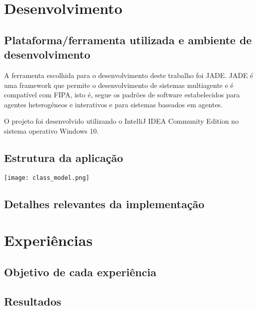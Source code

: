 \documentclass[a4paper]{article}
\begin{document}
\newpage

\section{Desenvolvimento}

\subsection{Plataforma/ferramenta utilizada e ambiente de desenvolvimento} 

A ferramenta escolhida para o desenvolvimento deste trabalho foi JADE. JADE é uma framework que permite o desenvolvimento de sistemas multiagente e é compatível com FIPA, isto é, segue os padrões de software estabelecidos para agentes heterogéneos e interativos e para sistemas baseados em agentes.

O projeto foi desenvolvido utilizando o IntelliJ IDEA Community Edition no sistema operativo Windows 10.

\subsection{Estrutura da aplicação} 

\begin{center}
\hspace*{-3.2cm}
	\texttt{[image: class\_model.png]}\linebreak\linebreak
\end{center}

\subsection{Detalhes relevantes da implementação} 

\newpage

\section{Experiências}

\subsection{Objetivo de cada experiência} 

\subsection{Resultados}
\end{document}
